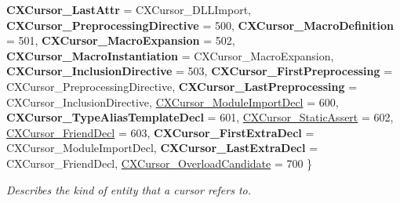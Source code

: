 \begin{DoxyCompactItemize}
\newline
{\bfseries C\+X\+Cursor\+\_\+\+Last\+Attr} = C\+X\+Cursor\+\_\+\+D\+L\+L\+Import, 
{\bfseries C\+X\+Cursor\+\_\+\+Preprocessing\+Directive} = 500, 
{\bfseries C\+X\+Cursor\+\_\+\+Macro\+Definition} = 501, 
{\bfseries C\+X\+Cursor\+\_\+\+Macro\+Expansion} = 502, 
\newline
{\bfseries C\+X\+Cursor\+\_\+\+Macro\+Instantiation} = C\+X\+Cursor\+\_\+\+Macro\+Expansion, 
{\bfseries C\+X\+Cursor\+\_\+\+Inclusion\+Directive} = 503, 
{\bfseries C\+X\+Cursor\+\_\+\+First\+Preprocessing} = C\+X\+Cursor\+\_\+\+Preprocessing\+Directive, 
{\bfseries C\+X\+Cursor\+\_\+\+Last\+Preprocessing} = C\+X\+Cursor\+\_\+\+Inclusion\+Directive, 
\newline
\mbox{\hyperlink{group__CINDEX_ggaaccc432245b4cd9f2d470913f9ef0013acf846838dc1c12e560c9dbf43fa97928}{C\+X\+Cursor\+\_\+\+Module\+Import\+Decl}} = 600, 
{\bfseries C\+X\+Cursor\+\_\+\+Type\+Alias\+Template\+Decl} = 601, 
\mbox{\hyperlink{group__CINDEX_ggaaccc432245b4cd9f2d470913f9ef0013acf4aa9fce47b10d5d3ff015c671dda45}{C\+X\+Cursor\+\_\+\+Static\+Assert}} = 602, 
\mbox{\hyperlink{group__CINDEX_ggaaccc432245b4cd9f2d470913f9ef0013ae0a01a4768fab70eadb25c755d5d36a6}{C\+X\+Cursor\+\_\+\+Friend\+Decl}} = 603, 
\newline
{\bfseries C\+X\+Cursor\+\_\+\+First\+Extra\+Decl} = C\+X\+Cursor\+\_\+\+Module\+Import\+Decl, 
{\bfseries C\+X\+Cursor\+\_\+\+Last\+Extra\+Decl} = C\+X\+Cursor\+\_\+\+Friend\+Decl, 
\mbox{\hyperlink{group__CINDEX_ggaaccc432245b4cd9f2d470913f9ef0013adf315bb7bfe68757ae933a8b95b40357}{C\+X\+Cursor\+\_\+\+Overload\+Candidate}} = 700
 \}
\begin{DoxyCompactList}\small\item\em Describes the kind of entity that a cursor refers to. \end{DoxyCompactList}\end{DoxyCompactItemize}
